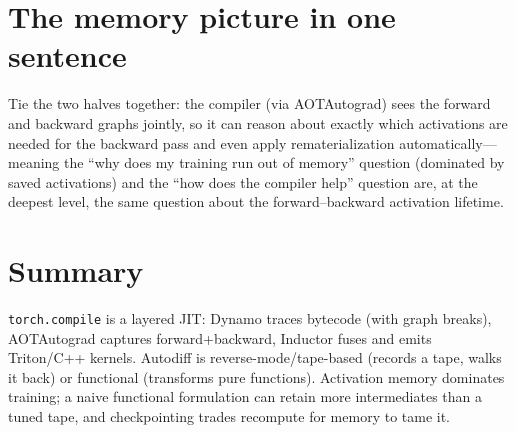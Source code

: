 \documentclass[11pt]{article}
\begin{document}
\section{The memory picture in one sentence}
Tie the two halves together: the compiler (via AOTAutograd) sees the forward and backward graphs jointly, so
it can reason about exactly which activations are needed for the backward pass and even apply
rematerialization automatically---meaning the ``why does my training run out of memory'' question (dominated
by saved activations) and the ``how does the compiler help'' question are, at the deepest level, the same
question about the forward--backward activation lifetime.

\section{Summary}
\texttt{torch.compile} is a layered JIT: Dynamo traces bytecode (with graph breaks), AOTAutograd captures
forward+backward, Inductor fuses and emits Triton/C++ kernels. Autodiff is reverse-mode/tape-based (records
a tape, walks it back) or functional (transforms pure functions). Activation memory dominates training; a
naive functional formulation can retain more intermediates than a tuned tape, and checkpointing trades
recompute for memory to tame it.



\end{document}
